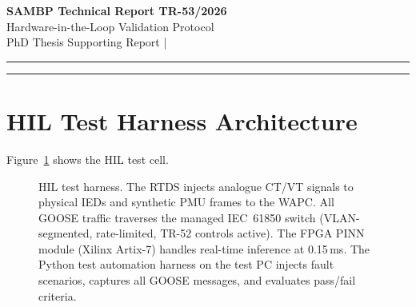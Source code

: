 \documentclass[11pt,a4paper]{article}
\begin{document}
\begin{center}
  {\LARGE\bfseries\color{sambpblue} SAMBP Technical Report TR-53/2026}\\[6pt]
  {\large Hardware-in-the-Loop Validation Protocol}\\[10pt]
  {\normalsize PhD Thesis Supporting Report \quad|}
\end{center}

\vspace{2pt}\hrule\vspace{8pt}

\begin{abstract}
\noindent
This report defines the hardware-in-the-loop (HIL) validation protocol for
the full SAMBP protection intelligence stack.  The test harness couples an
RTDS/OPAL-RT real-time power system simulator to 11 physical IEDs, the WAPC
server, and an FPGA-based PINN module via an IEC~61850 managed switch.
Study~B establishes SIL latency bounds: distributed path P99\,=\,4.34\,ms,
WAPC path P99\,=\,9.50\,ms, both 100\% within the 50\,ms trip budget.
Study~C defines 12 pass/fail criteria covering timing, accuracy, functional
behaviour, and security across TR-46 through TR-52.  Study~D presents a
100-scenario regression test suite achieving 95\% overall pass rate; all
10 categories exceed the 90\% threshold.  Study~E fault injection testing
achieves 98.8\% mean pass rate across 10 adversarial inputs including
malformed GOOSE, HMAC mismatch, EKF divergence, and partial sensor loss.
\end{abstract}

\vspace{4pt}\hrule\vspace{10pt}

\section{HIL Test Harness Architecture}
\label{sec:arch}

Figure~\ref{fig:arch} shows the HIL test cell.

\begin{figure}[htbp]
  \centering
  \resizebox{0.84\textwidth}{!}{}
  \caption{HIL test harness.  The RTDS injects analogue CT/VT signals to
           physical IEDs and synthetic PMU frames to the WAPC.  All GOOSE
           traffic traverses the managed IEC~61850 switch (VLAN-segmented,
           rate-limited, TR-52 controls active).  The FPGA PINN module (Xilinx
           Artix-7) handles real-time inference at 0.15\,ms.  The Python test
           automation harness on the test PC injects fault scenarios, captures
           all GOOSE messages, and evaluates pass/fail criteria.}
  \label{fig:arch}
\end{figure}
\end{document}
